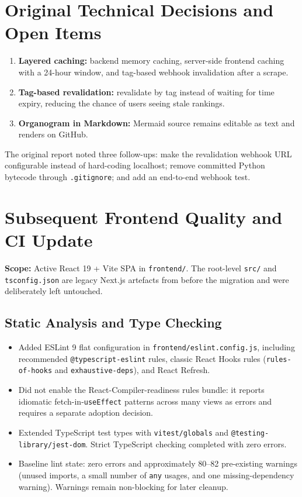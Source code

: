 \documentclass[11pt,a4paper]{article}
\begin{document}
\section*{Original Technical Decisions and Open Items}
\begin{enumerate}[leftmargin=1.6em,itemsep=2pt]
  \item \textbf{Layered caching:} backend memory caching, server-side frontend caching with a 24-hour window, and tag-based webhook invalidation after a scrape.
  \item \textbf{Tag-based revalidation:} revalidate by tag instead of waiting for time expiry, reducing the chance of users seeing stale rankings.
  \item \textbf{Organogram in Markdown:} Mermaid source remains editable as text and renders on GitHub.
\end{enumerate}
The original report noted three follow-ups: make the revalidation webhook URL configurable instead of hard-coding localhost; remove committed Python bytecode through \texttt{.gitignore}; and add an end-to-end webhook test.

\clearpage
\section*{Subsequent Frontend Quality and CI Update}
\textbf{Scope:} Active React 19 + Vite SPA in \texttt{frontend/}. The root-level \texttt{src/} and \texttt{tsconfig.json} are legacy Next.js artefacts from before the migration and were deliberately left untouched.

\subsection*{Static Analysis and Type Checking}
\begin{itemize}[leftmargin=1.4em,itemsep=2pt]
  \item Added ESLint 9 flat configuration in \texttt{frontend/eslint.config.js}, including recommended \texttt{@typescript-eslint} rules, classic React Hooks rules (\texttt{rules-of-hooks} and \texttt{exhaustive-deps}), and React Refresh.
  \item Did not enable the React-Compiler-readiness rules bundle: it reports idiomatic fetch-in-\texttt{useEffect} patterns across many views as errors and requires a separate adoption decision.
  \item Extended TypeScript test types with \texttt{vitest/globals} and \texttt{@testing-library/jest-dom}. Strict TypeScript checking completed with zero errors.
  \item Baseline lint state: zero errors and approximately 80--82 pre-existing warnings (unused imports, a small number of \texttt{any} usages, and one missing-dependency warning). Warnings remain non-blocking for later cleanup.
\end{itemize}
\end{document}
